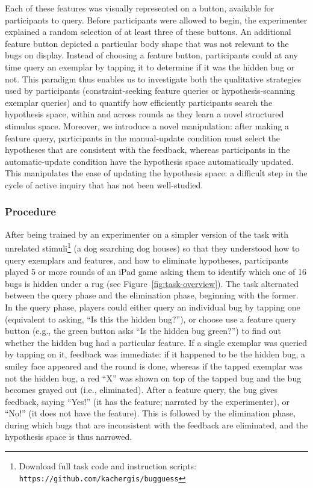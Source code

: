 \documentclass[man,floatsintext]{apa6}
\begin{document}
Each of these features was visually represented on a button, available for participants to query. Before 
participants were allowed to begin, the experimenter explained a random selection of at least three of 
these buttons. An additional feature button depicted a particular 
body shape that was not relevant to the bugs on display. Instead of choosing a feature button, participants could at any time query an exemplar by tapping it to determine if it was the hidden bug or not. This paradigm thus enables us to investigate both the qualitative strategies used by participants (constraint-seeking feature queries or hypothesis-scanning exemplar queries) and to quantify how efficiently participants search the hypothesis space, within and across rounds as they learn a novel structured stimulus space. Moreover, we introduce a novel manipulation: after making a feature query, participants in the manual-update condition must select the hypotheses that are consistent with the feedback, whereas participants in the automatic-update condition have the hypothesis space automatically updated. This manipulates the ease of updating the hypothesis space: a difficult step in the cycle of active inquiry that has not been well-studied. 

\subsubsection{Procedure}

After being trained by an experimenter on a simpler version of the task with unrelated stimuli\footnote{Download 
full task code and instruction scripts: \texttt{https://github.com/kachergis/bugguess}} (a dog searching dog houses) so that they understood how to query exemplars and features, and how 
to eliminate hypotheses, participants played 5 or more rounds of an iPad game asking them 
to identify which one of 16 bugs is hidden under a rug (see Figure~\ref{fig:task-overview}). 
The task alternated between the query phase and the elimination phase, beginning with the 
former. In the query phase, players could either query an individual bug by tapping one (equivalent 
to asking, ``Is this the hidden bug?''), or choose use a feature query button (e.g., the green button asks 
``Is the hidden bug green?'') to find out whether the hidden bug had a particular feature. If a 
single exemplar was queried by tapping on it, feedback was immediate: if it happened to be the 
hidden bug, a smiley face appeared and the round is done, whereas if the tapped exemplar 
was not the hidden bug, a red ``X'' was shown on top of the tapped bug and the bug becomes 
grayed out (i.e., eliminated). After a feature query, the bug gives feedback, saying 
``Yes!'' (it has the feature; narrated by the experimenter), or ``No!'' (it does not have 
the feature). This is followed by the elimination phase, during which bugs that are 
inconsistent with the feedback are eliminated, and the hypothesis space is thus narrowed. 
\end{document}
